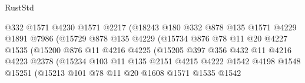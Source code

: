 \begin{lexlean}{RustStd}
\begin{coremodule}
{{                                @332
                                @1571
                                @4230
                                @1571
                                @2217
                                (@18243
                                  @180
                                  @332
                                  @878
                                  @135
                                  @1571
                                  @4229
                                  @1891
                                  @7986
                                  (@15729
                                    @878
                                    @135
                                    @4229
                                    (@15734
                                      @876
                                      @78
                                      @11
                                      @20
                                      @4227
                                      @1535
                                      (@15200
                                        @876
                                        @11
                                        @4216
                                        @4225
                                        (@15205
                                          @397
                                          @356
                                          @432
                                          @11
                                          @4216
                                          @4223
                                          @2378
                                          (@15234
                                            @103
                                            @11
                                            @135
                                            @2151
                                            @4215
                                            @4222
                                            @1542
                                            @4198
                                            @1548
                                            @15251
                                            (@15213
                                              @101
                                              @78
                                              @11
                                              @20
                                              @1608
                                              @1571
                                              @1535
                                              @1542
}}
\end{coremodule}
\end{lexlean}
